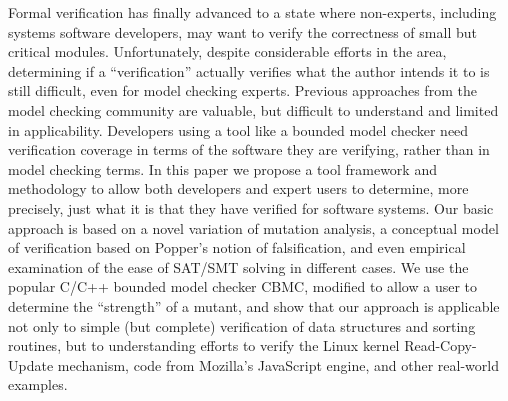 Formal verification has finally advanced to a state where non-experts, including systems software developers, may want to verify the correctness of small but critical modules.  Unfortunately, despite considerable efforts in the area, determining if a ``verification'' actually verifies what the author intends it to is still difficult, even for model checking experts.  Previous approaches from the model checking community are valuable, but difficult to understand and limited in applicability.  Developers using a tool like a bounded model checker need verification coverage in terms of the software they are verifying, rather than in model checking terms.  In this paper we propose a tool framework and methodology to allow both developers and expert users to determine, more precisely, just what it is that they have verified for software systems.  Our basic approach is based on a novel variation of mutation analysis, a conceptual model of verification based on Popper's notion of falsification, and even empirical examination of the ease of SAT/SMT solving in different cases.  We use the popular C/C++ bounded model checker CBMC, modified to allow a user to determine the ``strength'' of a mutant, and show that our approach is applicable not only to simple (but complete) verification of data structures and sorting routines, but to understanding efforts to verify the Linux kernel Read-Copy-Update mechanism, code from Mozilla's JavaScript engine, and other real-world examples.
